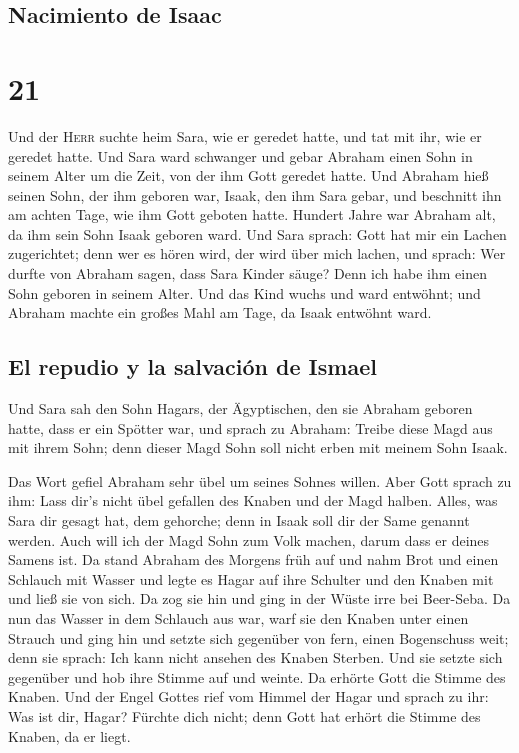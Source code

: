 \hypertarget{nacimiento-de-isaac}{%
\subsection{Nacimiento de Isaac}\label{nacimiento-de-isaac}}

\hypertarget{section-20}{%
\section{21}\label{section-20}}

 Und der \textsc{Herr} suchte heim Sara, wie er geredet
hatte, und tat mit ihr, wie er geredet hatte.  Und Sara
ward schwanger und gebar Abraham einen Sohn in seinem Alter um die Zeit,
von der ihm Gott geredet hatte.  Und Abraham hieß seinen
Sohn, der ihm geboren war, Isaak, den ihm Sara gebar,  und
beschnitt ihn am achten Tage, wie ihm Gott geboten hatte. 
Hundert Jahre war Abraham alt, da ihm sein Sohn Isaak geboren ward.
 Und Sara sprach: Gott hat mir ein Lachen zugerichtet;
denn wer es hören wird, der wird über mich lachen,  und
sprach: Wer durfte von Abraham sagen, dass Sara Kinder säuge? Denn ich
habe ihm einen Sohn geboren in seinem Alter.  Und das Kind
wuchs und ward entwöhnt; und Abraham machte ein großes Mahl am Tage, da
Isaak entwöhnt ward.

\hypertarget{el-repudio-y-la-salvaciuxf3n-de-ismael}{%
\subsection{El repudio y la salvación de
Ismael}\label{el-repudio-y-la-salvaciuxf3n-de-ismael}}

 Und Sara sah den Sohn Hagars, der Ägyptischen, den sie
Abraham geboren hatte, dass er ein Spötter war,  und
sprach zu Abraham: Treibe diese Magd aus mit ihrem Sohn; denn dieser
Magd Sohn soll nicht erben mit meinem Sohn Isaak.

 Das Wort gefiel Abraham sehr übel um seines Sohnes
willen.  Aber Gott sprach zu ihm: Lass dir's nicht übel
gefallen des Knaben und der Magd halben. Alles, was Sara dir gesagt hat,
dem gehorche; denn in Isaak soll dir der Same genannt werden.
 Auch will ich der Magd Sohn zum Volk machen, darum dass
er deines Samens ist.  Da stand Abraham des Morgens früh
auf und nahm Brot und einen Schlauch mit Wasser und legte es Hagar auf
ihre Schulter und den Knaben mit und ließ sie von sich. Da zog sie hin
und ging in der Wüste irre bei Beer-Seba.  Da nun das
Wasser in dem Schlauch aus war, warf sie den Knaben unter einen Strauch
 und ging hin und setzte sich gegenüber von fern, einen
Bogenschuss weit; denn sie sprach: Ich kann nicht ansehen des Knaben
Sterben. Und sie setzte sich gegenüber und hob ihre Stimme auf und
weinte.  Da erhörte Gott die Stimme des Knaben. Und der
Engel Gottes rief vom Himmel der Hagar und sprach zu ihr: Was ist dir,
Hagar? Fürchte dich nicht; denn Gott hat erhört die Stimme des Knaben,
da er liegt.

